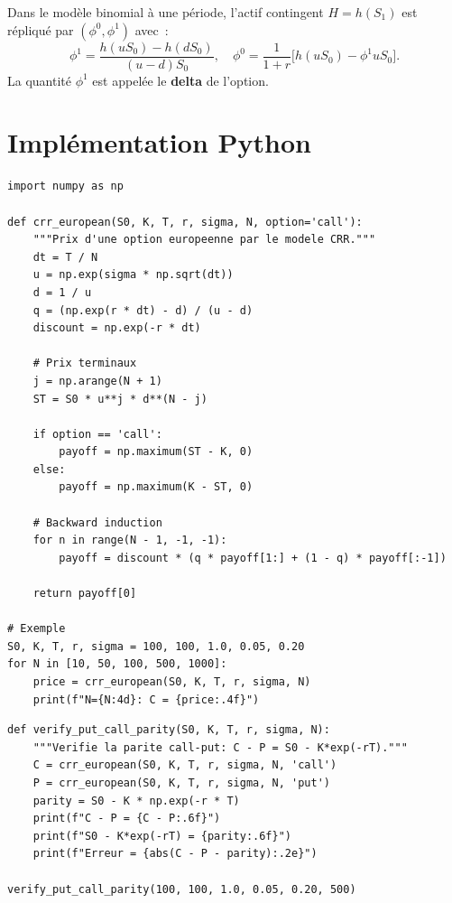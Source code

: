 \begin{proposition}
Dans le mod\`ele binomial \`a une p\'eriode, l'actif contingent
$H = h(S_1)$ est r\'epliqu\'e par $(\phi^0, \phi^1)$ avec~:
\[
    \phi^1 = \frac{h(uS_0) - h(dS_0)}{(u-d)S_0}, \quad
    \phi^0 = \frac{1}{1+r}\bigl[h(uS_0) - \phi^1 uS_0\bigr].
\]
La quantit\'e $\phi^1$ est appel\'ee le \textbf{delta} de l'option.
\end{proposition}

\section{Impl\'ementation Python}

\begin{codeblock}[title=\textbf{Mod\`ele binomial CRR en Python}]
\begin{verbatim}
import numpy as np

def crr_european(S0, K, T, r, sigma, N, option='call'):
    """Prix d'une option europeenne par le modele CRR."""
    dt = T / N
    u = np.exp(sigma * np.sqrt(dt))
    d = 1 / u
    q = (np.exp(r * dt) - d) / (u - d)
    discount = np.exp(-r * dt)

    # Prix terminaux
    j = np.arange(N + 1)
    ST = S0 * u**j * d**(N - j)

    if option == 'call':
        payoff = np.maximum(ST - K, 0)
    else:
        payoff = np.maximum(K - ST, 0)

    # Backward induction
    for n in range(N - 1, -1, -1):
        payoff = discount * (q * payoff[1:] + (1 - q) * payoff[:-1])

    return payoff[0]

# Exemple
S0, K, T, r, sigma = 100, 100, 1.0, 0.05, 0.20
for N in [10, 50, 100, 500, 1000]:
    price = crr_european(S0, K, T, r, sigma, N)
    print(f"N={N:4d}: C = {price:.4f}")
\end{verbatim}
\end{codeblock}

\begin{codeblock}[title=\textbf{Parit\'e call-put --- v\'erification}]
\begin{verbatim}
def verify_put_call_parity(S0, K, T, r, sigma, N):
    """Verifie la parite call-put: C - P = S0 - K*exp(-rT)."""
    C = crr_european(S0, K, T, r, sigma, N, 'call')
    P = crr_european(S0, K, T, r, sigma, N, 'put')
    parity = S0 - K * np.exp(-r * T)
    print(f"C - P = {C - P:.6f}")
    print(f"S0 - K*exp(-rT) = {parity:.6f}")
    print(f"Erreur = {abs(C - P - parity):.2e}")

verify_put_call_parity(100, 100, 1.0, 0.05, 0.20, 500)
\end{verbatim}
\end{codeblock}

